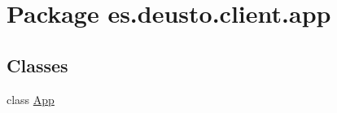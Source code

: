 \hypertarget{namespacees_1_1deusto_1_1client_1_1app}{}\section{Package es.\+deusto.\+client.\+app}
\label{namespacees_1_1deusto_1_1client_1_1app}
\subsection*{Classes}
\begin{DoxyCompactItemize}
\item 
class \mbox{\hyperlink{classes_1_1deusto_1_1client_1_1app_1_1_app}{App}}
\end{DoxyCompactItemize}
